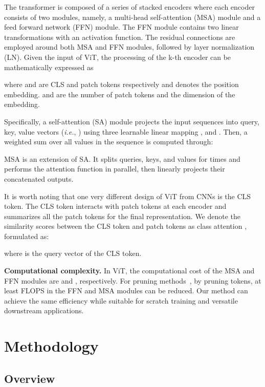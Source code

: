 \documentclass[letterpaper]{article} \usepackage{aaai22}  \usepackage{times}  \usepackage{helvet}  \usepackage{courier}  \usepackage[hyphens]{url}  \usepackage{graphicx} \urlstyle{rm} \def\UrlFont{\rm}  \usepackage{natbib}  \usepackage{caption} \DeclareCaptionStyle{ruled}{labelfont=normalfont,labelsep=colon,strut=off} \frenchspacing  \setlength{\pdfpagewidth}{8.5in}  \setlength{\pdfpageheight}{11in}  \usepackage{algorithm}
\begin{document}
The transformer is composed of a series of stacked encoders where each encoder consists of two modules, namely, a multi-head self-attention (MSA) module and a feed forward network (FFN) module. The FFN module  contains two linear transformations with an activation function. The residual connections are employed around both MSA and FFN modules, followed by layer normalization (LN).  Given the input  of ViT, the processing of the k-th encoder can be mathematically expressed as

where  and  are CLS and patch tokens respectively and  denotes the position embedding.  and  are the number of patch tokens and the dimension of the embedding.

Specifically, a self-attention (SA) module projects the input sequences into  query, key, value vectors (\emph{i.e.}, ) using three learnable linear mapping ,  and .  Then, a weighted sum over all values in the sequence is computed through:

MSA is an extension of SA. It splits queries, keys, and values for  times and performs the attention function in parallel, then linearly projects their concatenated outputs. 

It is worth noting that one very different design of ViT from CNNs is the CLS token. The CLS token interacts with patch tokens at each encoder and summarizes all the patch tokens for the final representation. We denote the similarity scores between the CLS token and patch tokens as class attention , formulated as:

where  is the query vector of the CLS token. 

\noindent\textbf{Computational complexity.}
In ViT, the computational cost of the MSA and FFN modules are  and , respectively. For pruning methods~\cite{DynamicViT, PatchSlimming}, by pruning  tokens, at least  FLOPS in the FFN and MSA modules can be reduced. Our method can achieve the same efficiency while suitable for scratch training and versatile downstream applications. 
\section{Methodology}
\label{sec:methodlogy}
\subsection{Overview}
\end{document}
